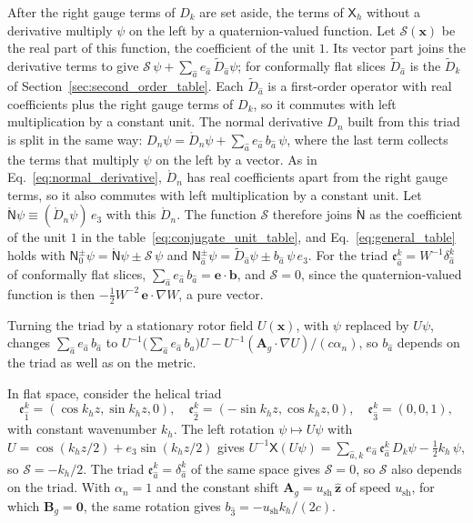 \documentclass[aps,prd,onecolumn,tightenlines,nofootinbib,notitlepage,11pt,floatfix]{revtex4-2}
\theoremstyle{indentedtheorem}
\begin{document}
After the right gauge terms of $D_k$ are set aside, the terms of $\mathsf{X}_h$ without a derivative multiply $\psi$ on the left by a quaternion-valued function. Let $\mathcal{S}(\mathbf{x})$ be the real part of this function, the coefficient of the unit $1$. Its vector part joins the derivative terms to give $\mathcal{S}\,\psi + \sum_{\hat{a}} e_{\hat{a}}\,\tilde{D}_{\hat{a}}\psi$; for conformally flat slices $\tilde{D}_{\hat{a}}$ is the $\tilde{D}_k$ of Section~\ref{sec:second_order_table}. Each $\tilde{D}_{\hat{a}}$ is a first-order operator with real coefficients plus the right gauge terms of $D_k$, so it commutes with left multiplication by a constant unit. The normal derivative $D_n$ built from this triad is split in the same way: $D_n\psi = \mathring{D}_n\psi + \sum_{\hat{a}} e_{\hat{a}}\,b_{\hat{a}}\,\psi$, where the last term collects the terms that multiply $\psi$ on the left by a vector. As in Eq.~\eqref{eq:normal_derivative}, $\mathring{D}_n$ has real coefficients apart from the right gauge terms, so it also commutes with left multiplication by a constant unit. Let $\mathring{\mathsf{N}}\psi \equiv (\mathring{D}_n\psi)\,e_3$ with this $\mathring{D}_n$. The function $\mathcal{S}$ therefore joins $\mathring{\mathsf{N}}$ as the coefficient of the unit $1$ in the table~\eqref{eq:conjugate_unit_table}, and Eq.~\eqref{eq:general_table} holds with $\mathsf{N}_0^\pm\psi = \mathring{\mathsf{N}}\psi \pm \mathcal{S}\,\psi$ and $\mathsf{N}_{\hat{a}}^\pm\psi = \tilde{D}_{\hat{a}}\psi \pm b_{\hat{a}}\,\psi\,e_3$. For the triad $\mathfrak{e}_{\hat{a}}^k = W^{-1}\delta_{\hat{a}}^k$ of conformally flat slices, $\sum_{\hat{a}} e_{\hat{a}}\,b_{\hat{a}} = \mathbf{e}\cdot\mathbf{b}$, and $\mathcal{S}=0$, since the quaternion-valued function is then $-\tfrac{1}{2}W^{-2}\,\mathbf{e}\cdot\nabla W$, a pure vector.

Turning the triad by a stationary rotor field $U(\mathbf{x})$, with $\psi$ replaced by $U\psi$, changes $\sum_{\hat{a}} e_{\hat{a}}\,b_{\hat{a}}$ to $U^{-1}\big(\sum_{\hat{a}} e_{\hat{a}}\,b_{\hat{a}}\big)U - U^{-1}(\mathbf{A}_g\cdot\nabla U)/(c\alpha_n)$, so $b_{\hat{a}}$ depends on the triad as well as on the metric.

In flat space, consider the helical triad \[ \mathfrak{e}_{\hat{1}}^k = (\cos k_hz,\sin k_hz,0) , \quad \mathfrak{e}_{\hat{2}}^k = (-\sin k_hz,\cos k_hz,0) , \quad \mathfrak{e}_{\hat{3}}^k = (0,0,1) , \] with constant wavenumber $k_h$. The left rotation $\psi\mapsto U\psi$ with $U = \cos(k_hz/2) + e_3\sin(k_hz/2)$ gives $U^{-1}\mathsf{X}(U\psi) = \sum_{\hat{a},k}e_{\hat{a}}\,\mathfrak{e}_{\hat{a}}^k\,D_k\psi - \tfrac{1}{2}k_h\,\psi$, so $\mathcal{S}=-k_h/2$. The triad $\mathfrak{e}_{\hat{a}}^k=\delta_{\hat{a}}^k$ of the same space gives $\mathcal{S}=0$, so $\mathcal{S}$ also depends on the triad. With $\alpha_n=1$ and the constant shift $\mathbf{A}_g = u_\text{sh}\,\hat{\mathbf{z}}$ of speed $u_\text{sh}$, for which $\mathbf{B}_g=\mathbf{0}$, the same rotation gives $b_{\hat{3}} = -u_\text{sh}k_h/(2c)$.
\end{document}
